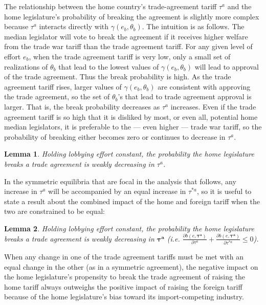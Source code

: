 \documentclass[10pt]{article}
\newtheorem{lemma}{Lemma}
\newcommand{\ta}{\theta}
\newcommand{\bta}{\bm{\tau^a}}
\newcommand{\ga}{\gamma}
\begin{document}
The relationship between the home country's trade-agreement tariff $\tau^a$ and the home legislature's probability of breaking the agreement is slightly more complex because $\tau^a$ interacts directly with $\ga(e_b,\ta_b)$. The intuition is as follows. The median legislator will vote to break the agreement if it receives higher welfare from the trade war tariff than the trade agreement tariff. For any given level of effort $e_b$, when the trade agreement tariff is very low, only a small set of realizations of $\ta_b$ that lead to the lowest values of $\ga(e_b,\ta_b)$ will lead to approval of the trade agreement. Thus the break probability is high. As the trade agreement tariff rises, larger values of $\ga(e_b,\ta_b)$ are consistent with approving the trade agreement, so the set of $\ta_b$'s that lead to trade agreement approval is larger. That is, the break probability decreases as $\tau^a$ increases. Even if the trade agreement tariff is so high that it is disliked by most, or even all, potential home median legislators, it is preferable to the --- even higher --- trade war tariff, so the probability of breaking either becomes zero or continues to decrease in $\tau^a$.

\begin{lemma}
  Holding lobbying effort constant, the probability the home legislature breaks a trade agreement is weakly decreasing in $\tau^a$.
  \label{res:leg_a}
\end{lemma}

In the symmetric equilibria that are focal in the analysis that follows, any increase in $\tau^a$ will be accompanied by an equal increase in $\tau^{*a}$, so it is useful to state a result about the combined impact of the home and foreign tariff when the two are constrained to be equal:
\begin{lemma}
	Holding lobbying effort constant, the probability the home legislature breaks a trade agreement is weakly decreasing in $\bta$ (i.e. $\frac{\partial b(e,\bta)}{\partial  \tau^a} + \frac{\partial b(e,\bta)}{\partial  \tau^{*a}} \leq 0$).
	\label{res:bcomb}
\end{lemma}

\noindent When any change in one of the trade agreement tariffs must be met with an equal change in the other (as in a symmetric agreement), the negative impact on the home legislature's propensity to break the trade agreement of raising the home tariff always outweighs the positive impact of raising the foreign tariff because of the home legislature's bias toward its import-competing industry.
\end{document}
